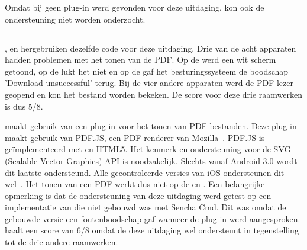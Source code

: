 Omdat bij \lungo{} geen plug-in werd gevonden voor deze uitdaging, kon ook de ondersteuning niet worden onderzocht.

% 
% 
% 
% 


\subsection{}
\label{sec:evaluatie-ondersteuning-pdf}

\kendo{}, \jqm{} en \lungo{} hergebruiken dezelfde code voor deze uitdaging.
Drie van de acht apparaten hadden problemen met het tonen van de PDF.
Op de \htc{} werd een wit scherm getoond, op de \gtab{} lukt het niet en op de \gs{} gaf het besturingssysteem de boodschap 'Download unsuccessful' terug.
Bij de vier andere apparaten werd de PDF-lezer geopend en kon het bestand worden bekeken.
De score voor deze drie raamwerken is dus 5/8.

\st{} maakt gebruik van een plug-in voor het tonen van PDF-bestanden.
Deze plug-in maakt gebruik van PDF.JS,  een PDF-renderer van Mozilla~\cite{Gal2010}.
PDF.JS is geïmplementeerd met \js{} en HTML5.
Het  kenmerk en ondersteuning voor de SVG (Scalable Vector Graphics) API is noodzakelijk.
Slechts vanaf Android 3.0 wordt dit laatste ondersteund.
Alle gecontroleerde versies van iOS ondersteunen dit wel~\cite{Deveria2013c}.
Het tonen van een PDF werkt dus niet op de \htc{} en \gtab{}.
Een belangrijke opmerking is dat de ondersteuning van deze uitdaging werd getest op een implementatie van \st{} die niet gebouwd was met Sencha Cmd.
Dit was omdat de gebouwde versie een foutenboodschap gaf wanneer de plug-in werd aangesproken.
\st{} haalt een score van 6/8 omdat de \gs{} deze uitdaging wel ondersteunt in tegenstelling tot de drie andere raamwerken.


